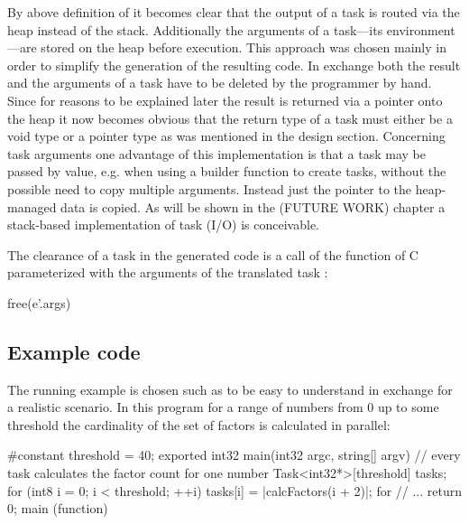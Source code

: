 By above definition of  it becomes clear that the output of a task is routed via the heap instead of the stack. Additionally the arguments of a task---its environment---are stored on the heap before execution. This approach was chosen mainly in order to simplify the generation of the resulting code. In exchange both the result and the arguments of a task have to be deleted by the programmer by hand. Since for reasons to be explained later the result is returned via a pointer onto the heap it now becomes obvious that the return type of a task must either be a void type or a pointer type as was mentioned in the design section. Concerning task arguments one advantage of this implementation is that a task may be passed by value, e.g. when using a builder function to create tasks, without the possible need to copy multiple arguments. Instead just the pointer to the heap-managed data is copied. As will be shown in the (FUTURE WORK) chapter a stack-based implementation of task (I/O) is conceivable. 

The clearance of a task  in the generated code is a call of the  function of C parameterized with the arguments of the translated task :
\begin{ccode}
free(e'.args)
\end{ccode}

\subsection{Example code}
The running example is chosen such as to be easy to understand in exchange for a realistic scenario. In this program for a range of numbers from 0 up to some threshold the cardinality of the set of factors is calculated in parallel:

\begin{ccode}
#constant threshold = 40; 
exported int32 main(int32 argc, string[] argv) { 
  // every task calculates the factor count for one number
  Task<int32*>[threshold] tasks; 
  for (int8 i = 0; i < threshold; ++i) { 
    tasks[i] = |calcFactors(i + 2)|; 
  } for 
  // ...
  return 0; 
} main (function)

\end{ccode}

